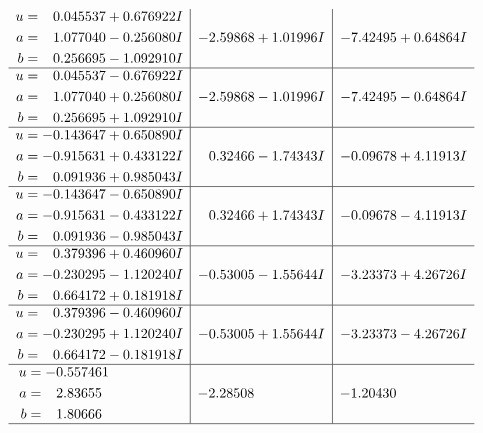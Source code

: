 \documentclass[1p]{elsarticle_modified}
\theoremstyle{definition}
\begin{document}
$$\begin{array}{c|c|c}
\begin{aligned}
u &= \phantom{-}0.045537 + 0.676922 I \\
a &= \phantom{-}1.077040 - 0.256080 I \\
b &= \phantom{-}0.256695 - 1.092910 I\end{aligned}
 & -2.59868 + 1.01996 I & -7.42495 + 0.64864 I \\ \hline\begin{aligned}
u &= \phantom{-}0.045537 - 0.676922 I \\
a &= \phantom{-}1.077040 + 0.256080 I \\
b &= \phantom{-}0.256695 + 1.092910 I\end{aligned}
 & -2.59868 - 1.01996 I & -7.42495 - 0.64864 I \\ \hline\begin{aligned}
u &= -0.143647 + 0.650890 I \\
a &= -0.915631 + 0.433122 I \\
b &= \phantom{-}0.091936 + 0.985043 I\end{aligned}
 & \phantom{-}0.32466 - 1.74343 I & -0.09678 + 4.11913 I \\ \hline\begin{aligned}
u &= -0.143647 - 0.650890 I \\
a &= -0.915631 - 0.433122 I \\
b &= \phantom{-}0.091936 - 0.985043 I\end{aligned}
 & \phantom{-}0.32466 + 1.74343 I & -0.09678 - 4.11913 I \\ \hline\begin{aligned}
u &= \phantom{-}0.379396 + 0.460960 I \\
a &= -0.230295 - 1.120240 I \\
b &= \phantom{-}0.664172 + 0.181918 I\end{aligned}
 & -0.53005 - 1.55644 I & -3.23373 + 4.26726 I \\ \hline\begin{aligned}
u &= \phantom{-}0.379396 - 0.460960 I \\
a &= -0.230295 + 1.120240 I \\
b &= \phantom{-}0.664172 - 0.181918 I\end{aligned}
 & -0.53005 + 1.55644 I & -3.23373 - 4.26726 I \\ \hline\begin{aligned}
u &= -0.557461\phantom{ +0.000000I} \\
a &= \phantom{-}2.83655\phantom{ +0.000000I} \\
b &= \phantom{-}1.80666\phantom{ +0.000000I}\end{aligned}
 & -2.28508\phantom{ +0.000000I} & -1.20430\phantom{ +0.000000I}\\
 \hline 
 \end{array}$$\newpage\newpage\renewcommand{\arraystretch}{1}
\end{document}
